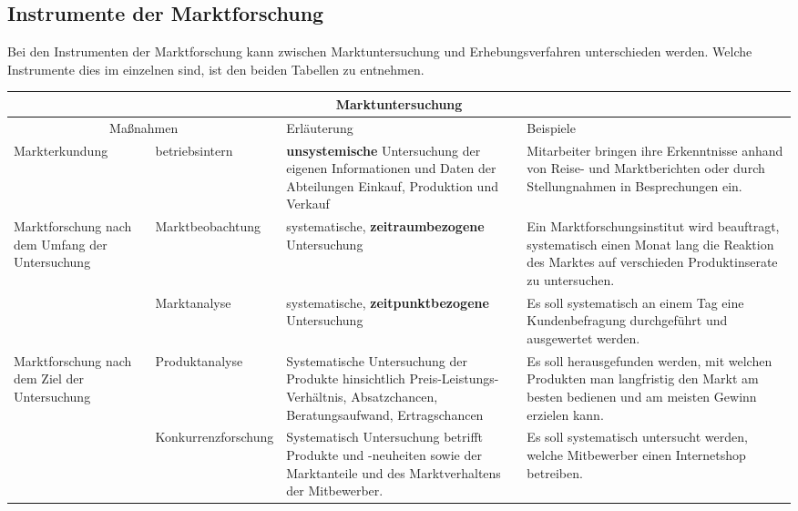 \subsection{Instrumente der Marktforschung}

Bei den Instrumenten der Marktforschung kann zwischen Marktuntersuchung und Erhebungsverfahren unterschieden werden. Welche Instrumente dies im einzelnen sind, ist den beiden Tabellen zu entnehmen.

\noindent \begin{tabular}{|p{}|
				 p{}|
				 p{}|
				 p{}|} %
	\hline
	\multicolumn{4}{|c|}{{{\bf{\large Marktuntersuchung}}}} \\
	\hline
	\multicolumn{2}{|c|}{Maßnahmen} & Erläuterung & Beispiele \\
	\hline
Markterkundung & betriebsintern & {\bf unsystemische} Untersuchung der eigenen Informationen und Daten der Abteilungen Einkauf, Produktion und Verkauf & Mitarbeiter bringen ihre Erkenntnisse anhand von Reise- und Marktberichten oder durch Stellungnahmen in Besprechungen ein. \\
	\hline
Marktforschung nach dem Umfang der Untersuchung & Marktbeobachtung
& systematische, {\bf zeitraumbezogene} Untersuchung & Ein Marktforschungsinstitut wird beauftragt, systematisch einen Monat lang die Reaktion des Marktes auf verschieden Produktinserate zu untersuchen. \\
	\cline{2-4}
& Marktanalyse & systematische, {\bf zeitpunktbezogene} Untersuchung & Es soll systematisch an einem Tag eine Kundenbefragung durchgeführt und ausgewertet werden. \\
	\hline
Marktforschung nach dem Ziel der Untersuchung
& Produktanalyse & Systematische Untersuchung der Produkte hinsichtlich Preis-Leistungs-Verhältnis, Absatzchancen, Beratungsaufwand, Ertragschancen & Es soll herausgefunden werden, mit welchen Produkten man langfristig den Markt am besten bedienen und am meisten Gewinn erzielen kann. \\
	\cline{2-4}
& Konkurrenzforschung & Systematisch Untersuchung betrifft Produkte und -neuheiten sowie der Marktanteile und des Marktverhaltens der Mitbewerber. & Es soll systematisch untersucht werden, welche Mitbewerber einen Internetshop betreiben. \\

\end{tabular}

